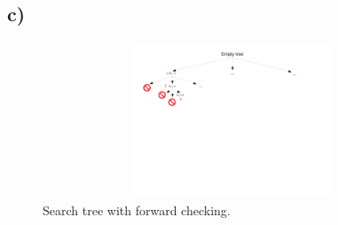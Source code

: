 \documentclass[11pt,letterpaper]{article}
\begin{document}
        \subsection{c)}
        \begin{figure}[ht]
			\centering
			\includegraphics[height=175px,width=425px,trim={0 350 100 0},clip]{q4c.pdf}
			\linespread{0.8}\caption{Search tree with forward checking.}
		\end{figure}
	
\end{document}
